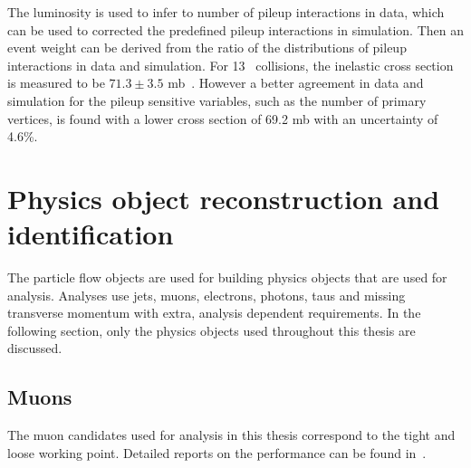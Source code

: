 The luminosity is used to infer to number of pileup interactions in data, which can be used to corrected the predefined pileup interactions in simulation. Then an event weight can be derived from the ratio of the distributions of pileup interactions in data and simulation. For 13 \TeV\ collisions, the inelastic cross section is measured to be $71.3\pm3.5$ mb~\cite{CMS-PAS-FSQ-15-005}. However a better agreement in data and simulation for the pileup sensitive variables, such as the number of primary vertices, is found with a lower cross section of 69.2 mb with an uncertainty of 4.6\%. %




\section{Physics object reconstruction and identification}
\label{sec:PhysicsObject}
The particle flow objects are used for building physics objects that are used for analysis. Analyses use jets, muons, electrons, photons, taus and missing transverse momentum \ptmisvec with extra, analysis dependent requirements. In the following section, only the physics objects used throughout this thesis are discussed. 

\subsection{Muons}
\label{sec:MuonID}
The muon candidates used for analysis in this thesis correspond to the tight and loose working point. Detailed reports on the performance can be found in~\cite{CMS-DP-2017-007}.

